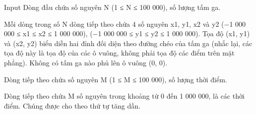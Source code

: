 Input
Dòng đầu chứa số nguyên N (1 ≤ N ≤ 100 000), số lượng tấm ga.  

   Mỗi dòng trong số N dòng tiếp theo chứa 4 số nguyên x1, y1, x2 và y2 (−1 000 000 ≤ x1 ≤ x2 ≤ 1 000 000), (−1 000 000 ≤ y1 ≤ y2 ≤ 1 000 000). Tọa độ (x1, y1) và (x2, y2) biểu diễn hai đỉnh đối diện theo đường chéo của tấm ga (nhắc lại, các tọa độ này là tọa độ của các ô vuông, không phải tọa độ các điểm trên mặt phẳng). Không có tấm ga nào phủ lên ô vuông (0, 0).  

   Dòng tiếp theo chứa số nguyên M (1 ≤ M ≤ 100 000), số lượng thời điểm.  

   Dòng tiếp theo chứa M số nguyên trong khoảng từ 0 đến 1 000 000, là các thời điểm. Chúng được cho theo thứ tự tăng dần.